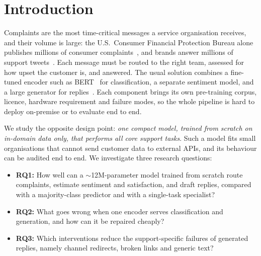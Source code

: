 \documentclass[conference]{IEEEtran}
\begin{document}
\section{Introduction}
Complaints are the most time-critical messages a service organisation receives, and their volume is large: the U.S.\ Consumer Financial Protection Bureau alone publishes millions of consumer complaints~\cite{cfpbcomplaints}, and brands answer millions of support tweets~\cite{twcs2017dataset}. Each message must be routed to the right team, assessed for how upset the customer is, and answered. The usual solution combines a fine-tuned encoder such as BERT~\cite{devlin2019bert} for classification, a separate sentiment model, and a large generator for replies~\cite{zhang2020dialogpt}. Each component brings its own pre-training corpus, licence, hardware requirement and failure modes, so the whole pipeline is hard to deploy on-premise or to evaluate end to end.

We study the opposite design point: \emph{one compact model, trained from scratch on in-domain data only, that performs all core support tasks}. Such a model fits small organisations that cannot send customer data to external APIs, and its behaviour can be audited end to end. We investigate three research questions:
\begin{itemize}
\item \textbf{RQ1:} How well can a $\sim$12M-parameter model trained from scratch route complaints, estimate sentiment and satisfaction, and draft replies, compared with a majority-class predictor and with a single-task specialist?
\item \textbf{RQ2:} What goes wrong when one encoder serves classification and generation, and how can it be repaired cheaply?
\item \textbf{RQ3:} Which interventions reduce the support-specific failures of generated replies, namely channel redirects, broken links and generic text?
\end{itemize}
\end{document}
